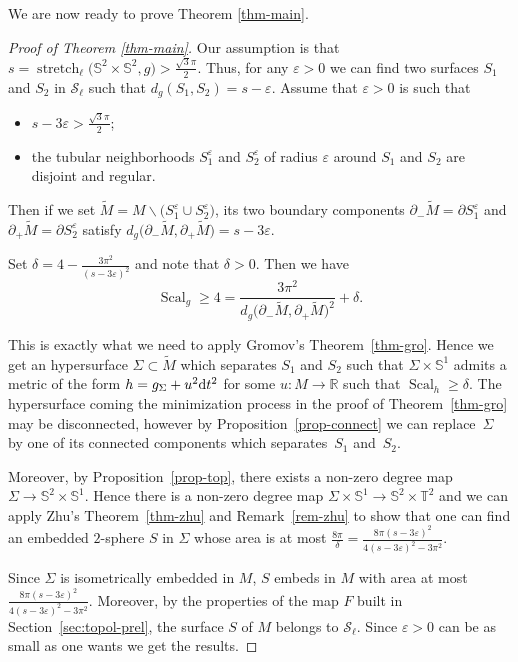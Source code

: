 \documentclass[10pt,a4paper]{amsart}
\numberwithin{equation}{section}
\DeclareMathOperator{\scal}{Scal}
\DeclareMathOperator{\str}{stretch}
\newcommand{\eps}{\varepsilon}
\begin{document}
We are now ready to prove Theorem \ref{thm-main}.

\begin{proof}[Proof of Theorem \ref{thm-main}]
 Our assumption is that $s=\str_{\ell}\big(\mathbb{S}^2\times \mathbb{S}^2,g\big) >
 \tfrac{\sqrt{3}\pi}{2}$. Thus, for any $\eps>0$ we can find two surfaces
 $S_1$ and $S_2$ in $\mathcal{S}_\ell$ such that $d_g(S_1,S_2)=
 s-\eps$. Assume that $\eps>0$ is such that
 \begin{itemize}\itemsep=0pt
 \item $s-3\eps>\frac{\sqrt{3}\pi}{2}$;
 \item the tubular neighborhoods $S_1^\eps$ and $S_2^\eps$ of radius
 $\eps$ around $S_1$ and $S_2$ are disjoint and regular.
 \end{itemize}
 Then if we set $\tilde M=M\backslash \big(S_1^\eps\cup S_2^\eps\big)$, its
 two boundary components $\partial_-\tilde M=\partial S_1^\eps$ and
 $\partial_+\tilde M=\partial S_2^\eps$ satisfy $d_g\big(\partial_-\tilde
 M, \partial_+\tilde M\big)= s-3\eps$.

 Set $\delta=4-\frac{3\pi^2}{(s-3\eps)^2}$ and note that $\delta>0$. Then we have
 \[\scal_g\geq 4=\frac{3\pi^2}{d_g\big(\partial_-\tilde
 M, \partial_+\tilde M\big)^2}+\delta.\]

 This is exactly what we need to apply Gromov's Theorem~\ref{thm-gro}. Hence we get an hypersurface $\Sigma\subset\tilde M$
 which separates $S_1$ and $S_2$ such that
 $\Sigma\times\mathbb{S}^1$ admits a metric of the form
 $h=g_\Sigma+u^2{\rm d}t^2$ for some $u\colon M\to\mathbb{R}$ such that
 $\scal_h\geq\delta$. The hypersurface coming the minimization
 process in the proof of Theorem~\ref{thm-gro} may be disconnected,
 however by Proposition~\ref{prop-connect} we can replace~$\Sigma$ by
 one of its connected components which separates~$S_1$ and~$S_2$.

 Moreover, by Proposition~\ref{prop-top}, there exists a non-zero
 degree map $\Sigma\to\mathbb{S}^2\times\mathbb{S}^1$. Hence there is
 a non-zero degree map
 $\Sigma\times\mathbb{S}^1\to\mathbb{S}^2\times\mathbb{T}^2$ and we
 can apply Zhu's Theorem~\ref{thm-zhu} and Remark~\ref{rem-zhu} to
 show that one can find an embedded $2$-sphere $S$ in $\Sigma$ whose
 area is at most $\frac{8\pi}{\delta}=\frac{8\pi
 (s-3\eps)^2}{4(s-3\eps)^2-3\pi^2}$.

 Since $\Sigma$ is isometrically embedded in
 $M$, $S$ embeds in $M$ with area at most $\frac{8\pi
 (s-3\eps)^2}{4(s-3\eps)^2-3\pi^2}$. Moreover, by the properties of the map $F$
 built in Section~\ref{sec:topol-prel}, the surface $S$ of $M$
 belongs to $\mathcal{S}_\ell$. Since $\eps>0$ can be as small as one
 wants we get the results.
\end{proof}
\end{document}
